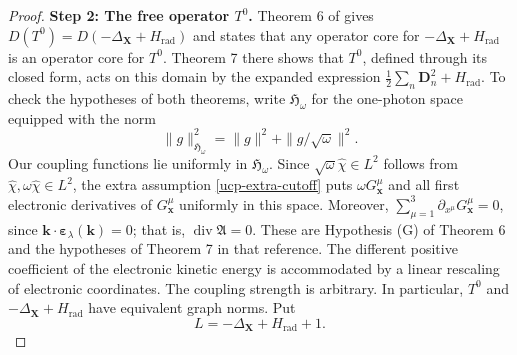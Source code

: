 \documentclass[final,reqno]{amsart}
\DeclareMathOperator{\div}{div}
\theoremstyle{remark}
\newcommand{\DC}{D}
\newcommand{\AF}{\bm{\mathfrak{A}}}
\newcommand{\rad}{\mathrm{rad}}
\newcommand{\Hil}{\mathfrak{H}}
\newcommand{\vepsilon}{{\bm{\epsilon}}}
\newcommand{\vk}{\mathbf{k}}
\newcommand{\vx}{\mathbf{x}}
\newcommand{\vX}{{\mathbf{X}}}
\newcommand{\vD}{{\mathbf{D}}}
\newcommand{\wh}[1]{\widehat{#1}}
\renewcommand{\epsilon}{\varepsilon}
\begin{document}
\begin{proof}
\noindent\textbf{Step 2: The free operator $T^0$.}
Theorem 6 of \cite{hasler2008selfadjoint} gives
$\DC(T^0)=\DC(-\Delta_{\vX}+H_\rad)$ and states that any operator core
for $-\Delta_{\vX}+H_\rad$ is an operator core for $T^0$.  Theorem 7
there shows that $T^0$, defined through its closed form, acts on this
domain by the expanded expression $\frac12\sum_n\vD_n^2+H_\rad$.  To
check the hypotheses of both theorems,
write $\Hil_\omega$ for the one-photon space equipped with the norm
\[
 \|g\|_{\Hil_\omega}^2=\|g\|^2+\|g/\sqrt\omega\|^2.
\]
Our coupling functions lie uniformly in $\Hil_\omega$.  Since
$\sqrt\omega\wh\chi\in L^2$ follows from
$\wh\chi,\omega\wh\chi\in L^2$, the extra
assumption \cref{ucp-extra-cutoff} puts $\omega G^\mu_\vx$ and all
first electronic derivatives of $G^\mu_\vx$ uniformly in this space.
Moreover, $\sum_{\mu=1}^3\partial_{x^\mu}G^\mu_\vx=0$, since
$\vk\cdot\vepsilon_\lambda(\vk)=0$; that is, $\div\AF=0$.
These are Hypothesis (G) of Theorem 6 and the hypotheses of Theorem 7
in that reference.  The different positive coefficient of the electronic
kinetic energy is accommodated by a linear rescaling of electronic
coordinates.  The coupling strength is arbitrary.  In particular,
$T^0$ and $-\Delta_{\vX}+H_\rad$ have equivalent graph norms.  Put
\begin{equation}\label{ucp-free-comparison-operator}
 L=-\Delta_{\vX}+H_\rad+1.
\end{equation}


\end{proof}
\end{document}
